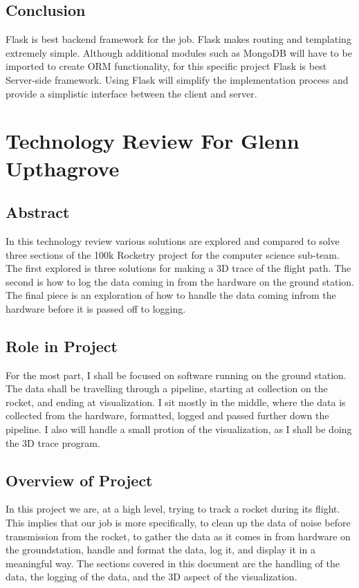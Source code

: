 \documentclass[onecolumn, draftclsnofoot,10pt, compsoc]{IEEEtran}
\begin{document}
\subsection{Conclusion}
Flask is best backend framework for the job. Flask makes routing and templating extremely simple. Although additional modules such as MongoDB will have to be imported to create ORM functionality, for this specific project Flask is best Server-side framework. Using Flask will simplify the implementation process and provide a simplistic interface between the client and server.

\section{Technology Review For Glenn Upthagrove}
\subsection{Abstract}
In this technology review various solutions are explored and compared to solve three sections of the 100k Rocketry project for the computer science sub-team. The first explored is three solutions for making a 3D trace of the flight path. The second is how to log the data coming in from the hardware on the ground station. The final piece is an exploration of how to handle the data coming infrom the hardware before it is passed off to logging.
\subsection{Role in Project}
For the most part, I shall be focused on software running on the ground station. The data shall be travelling through a pipeline, starting at collection on the rocket, and ending at visualization. I sit mostly in the middle, where the data is collected from the hardware, formatted, logged and passed further down the pipeline. I also will handle a small protion of the visualization, as I shall be doing the 3D trace program. 
\subsection{Overview of Project}
In this project we are, at a high level, trying to track a rocket during its flight. This implies that our job is more specifically, to clean up the data of noise before transmission from the rocket, to gather the data as it comes in from hardware on the groundstation, handle and format the data, log it, and display it in a meaningful way. The sections covered in this document are the handling of the data, the logging of the data, and the 3D aspect of the visualization. 
\end{document}
